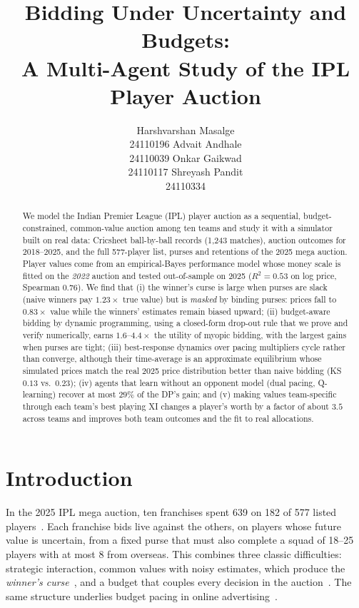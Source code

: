 \documentclass{article}
\title{Bidding Under Uncertainty and Budgets:\\ A Multi-Agent Study of the IPL Player Auction}
\date{}
\author{
  Harshvarshan Masalge \\ 24110196
  \And
  Advait Andhale \\ 24110039
  \And
  Onkar Gaikwad \\ 24110117
  \And
  Shreyash Pandit \\ 24110334
}
\newcommand{\1}{\mathbb{1}}
\newcommand{\crore}{\text{\,cr}}
\newcommand{\rupee}{\text{Rs.\,}}
\begin{document}
\maketitle

\begin{abstract}
We model the Indian Premier League (IPL) player auction as a sequential, budget-constrained, common-value auction among ten teams and study it with a simulator built on real data: Cricsheet ball-by-ball records (1{,}243 matches), auction outcomes for 2018--2025, and the full 577-player list, purses and retentions of the 2025 mega auction. Player values come from an empirical-Bayes performance model whose money scale is fitted on the \emph{2022} auction and tested out-of-sample on 2025 ($R^2=0.53$ on log price, Spearman $0.76$). We find that (i) the winner's curse is large when purses are slack (naive winners pay $1.23\times$ true value) but is \emph{masked} by binding purses: prices fall to $0.83\times$ value while the winners' estimates remain biased upward; (ii) budget-aware bidding by dynamic programming, using a closed-form drop-out rule that we prove and verify numerically, earns $1.6$--$4.4\times$ the utility of myopic bidding, with the largest gains when purses are tight; (iii) best-response dynamics over pacing multipliers cycle rather than converge, although their time-average is an approximate equilibrium whose simulated prices match the real 2025 price distribution better than naive bidding (KS $0.13$ vs.\ $0.23$); (iv) agents that learn without an opponent model (dual pacing, Q-learning) recover at most $29\%$ of the DP's gain; and (v) making values team-specific through each team's best playing XI changes a player's worth by a factor of about $3.5$ across teams and improves both team outcomes and the fit to real allocations.
\end{abstract}


\section{Introduction}
\label{sec:intro}
In the 2025 IPL mega auction, ten franchises spent \rupee639\crore{} on 182 of 577 listed players~\citep{kaggle_auction}. Each franchise bids live against the others, on players whose future value is uncertain, from a fixed purse that must also complete a squad of 18--25 players with at most 8 from overseas. This combines three classic difficulties: strategic interaction, common values with noisy estimates, which produce the \emph{winner's curse}~\citep{capen1971,wilson1977,milgrom1982,thaler1988}, and a budget that couples every decision in the auction~\citep{benoit2001}. The same structure underlies budget pacing in online advertising~\citep{borgs2007,balseiro2019,conitzer2022}.
\end{document}
